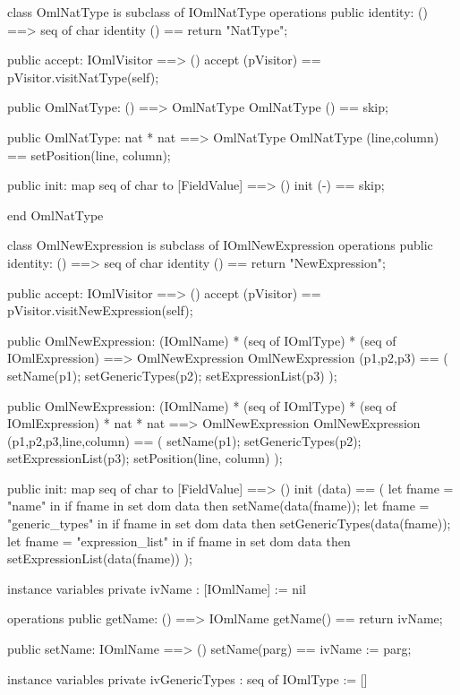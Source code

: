 \begin{vdm_al}
class OmlNatType is subclass of IOmlNatType
operations
  public identity: () ==> seq of char
  identity () == return "NatType";

  public accept: IOmlVisitor ==> ()
  accept (pVisitor) == pVisitor.visitNatType(self);

  public OmlNatType:
    () ==> OmlNatType
  OmlNatType () == 
    skip;

  public OmlNatType:
    nat *
    nat ==> OmlNatType
  OmlNatType (line,column) == 
    setPosition(line, column);

  public init: map seq of char to [FieldValue] ==> ()
  init (-) == skip;

end OmlNatType
\end{vdm_al}

\begin{vdm_al}
class OmlNewExpression is subclass of IOmlNewExpression
operations
  public identity: () ==> seq of char
  identity () == return "NewExpression";

  public accept: IOmlVisitor ==> ()
  accept (pVisitor) == pVisitor.visitNewExpression(self);

  public OmlNewExpression:
    (IOmlName) *
    (seq of IOmlType) *
    (seq of IOmlExpression) ==> OmlNewExpression
  OmlNewExpression (p1,p2,p3) == 
    ( setName(p1);
      setGenericTypes(p2);
      setExpressionList(p3) );

  public OmlNewExpression:
    (IOmlName) *
    (seq of IOmlType) *
    (seq of IOmlExpression) *
    nat *
    nat ==> OmlNewExpression
  OmlNewExpression (p1,p2,p3,line,column) == 
    ( setName(p1);
      setGenericTypes(p2);
      setExpressionList(p3);
      setPosition(line, column) );

  public init: map seq of char to [FieldValue] ==> ()
  init (data) ==
    ( let fname = "name" in
        if fname in set dom data
        then setName(data(fname));
      let fname = "generic_types" in
        if fname in set dom data
        then setGenericTypes(data(fname));
      let fname = "expression_list" in
        if fname in set dom data
        then setExpressionList(data(fname)) );

instance variables
  private ivName : [IOmlName] := nil

operations
  public getName: () ==> IOmlName
  getName() == return ivName;

  public setName: IOmlName ==> ()
  setName(parg) == ivName := parg;

instance variables
  private ivGenericTypes : seq of IOmlType := []


\end{vdm_al}
